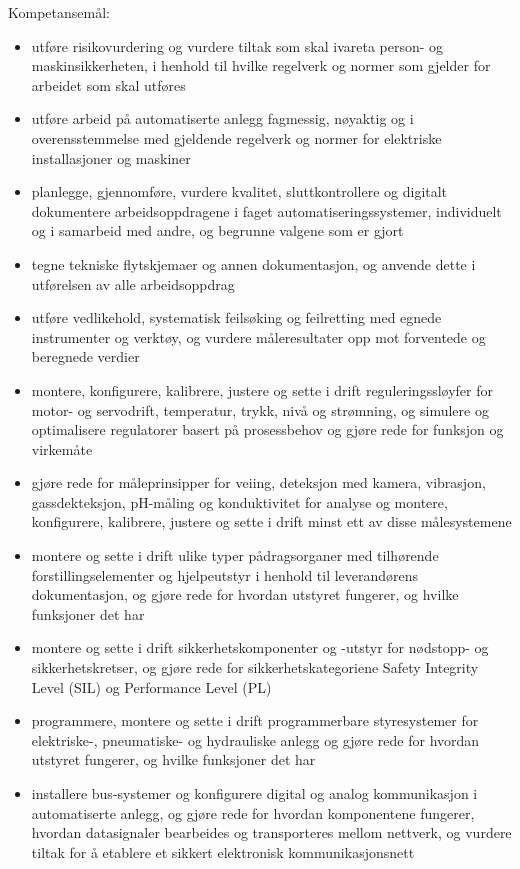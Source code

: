 \vskip 2.5pt 
Kompetansemål:
\begin{itemize}[noitemsep]

	\item utføre risikovurdering og vurdere tiltak som skal ivareta person- og maskinsikkerheten, i henhold til hvilke regelverk og normer som gjelder for arbeidet som skal utføres
	\item utføre arbeid på automatiserte anlegg fagmessig, nøyaktig og i overensstemmelse med gjeldende regelverk og normer for elektriske installasjoner og maskiner
	\item planlegge, gjennomføre, vurdere kvalitet, sluttkontrollere og digitalt dokumentere arbeidsoppdragene i faget automatiseringssystemer, individuelt og i samarbeid med andre, og begrunne valgene som er gjort
	\item tegne tekniske flytskjemaer og annen dokumentasjon, og anvende dette i utførelsen av alle arbeidsoppdrag
	\item utføre vedlikehold, systematisk feilsøking og feilretting med egnede instrumenter og verktøy, og vurdere måleresultater opp mot forventede og beregnede verdier
	\item montere, konfigurere, kalibrere, justere og sette i drift reguleringssløyfer for motor- og servodrift, temperatur, trykk, nivå og strømning, og simulere og optimalisere regulatorer basert på prosessbehov og gjøre rede for funksjon og virkemåte
	\item gjøre rede for måleprinsipper for veiing, deteksjon med kamera, vibrasjon, gassdekteksjon, pH-måling og konduktivitet for analyse og montere, konfigurere, kalibrere, justere og sette i drift minst ett av disse målesystemene
	\item montere og sette i drift ulike typer pådragsorganer med tilhørende forstillingselementer og hjelpeutstyr i henhold til leverandørens dokumentasjon, og gjøre rede for hvordan utstyret fungerer, og hvilke funksjoner det har
	\item montere og sette i drift sikkerhetskomponenter og -utstyr for nødstopp- og sikkerhetskretser, og gjøre rede for sikkerhetskategoriene Safety Integrity Level (SIL) og Performance Level (PL)
	\item programmere, montere og sette i drift programmerbare styresystemer for elektriske-, pneumatiske- og hydrauliske anlegg og gjøre rede for hvordan utstyret fungerer, og hvilke funksjoner det har
	\item installere bus-systemer og konfigurere digital og analog kommunikasjon i automatiserte anlegg, og gjøre rede for hvordan komponentene fungerer, hvordan datasignaler bearbeides og transporteres mellom nettverk, og vurdere tiltak for å etablere et sikkert elektronisk kommunikasjonsnett

\end{itemize}
